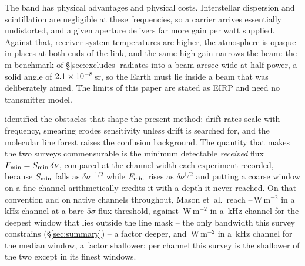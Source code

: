 The band has physical advantages and physical costs. Interstellar dispersion
and scintillation are negligible at these frequencies, so a carrier arrives
essentially undistorted, and a given aperture delivers far more gain per watt
supplied. Against that, receiver system temperatures are higher, the atmosphere
is opaque in places at both ends of the link, and the same high gain narrows
the beam: the \BenchDiam\,m benchmark of \S\ref{sec:excludes} radiates into a
beam \BmArcsec{} arcsec wide at half power, a solid angle of $2.1\times10^{-8}$\,sr,
so the Earth must lie inside a beam that was deliberately aimed. The limits of
this paper are stated as EIRP and need no transmitter model.

\citet{Mason2025} identified the obstacles that shape the present method: drift
rates scale with frequency, smearing erodes sensitivity unless drift is
searched for, and the molecular line forest raises the confusion
background. The quantity that makes the two surveys commensurable is the
minimum detectable \emph{received} flux $F_{\rm min}=S_{\rm min}\,\delta\nu$,
compared at the channel width each experiment recorded, because $S_{\rm min}$
falls as $\delta\nu^{-1/2}$ while $F_{\rm min}$ rises as $\delta\nu^{1/2}$ and
putting a coarse window on a fine channel arithmetically credits it with a
depth it never reached. On that convention and on native channels throughout,
Mason et~al.\ reach \MasonFluxLo--\MasonFluxHi\,W\,m$^{-2}$ in a
\MasonChanKHz\,kHz channel at a bare $5\sigma$ flux threshold, against
\FluxTrigBest\,W\,m$^{-2}$ in a \FluxChanBestKHz\,kHz channel for the deepest
window that lies outside the line mask -- the only bandwidth this survey
constrains (\S\ref{sec:summary}) -- a factor \FluxNatBestRatio{} deeper, and
\FluxTrigMed\,W\,m$^{-2}$ in a \FluxChanMedKHz\,kHz channel for the median
window, a factor \FluxNatMedRatio{} shallower: per channel this survey is the
shallower of the two except in its finest windows.

